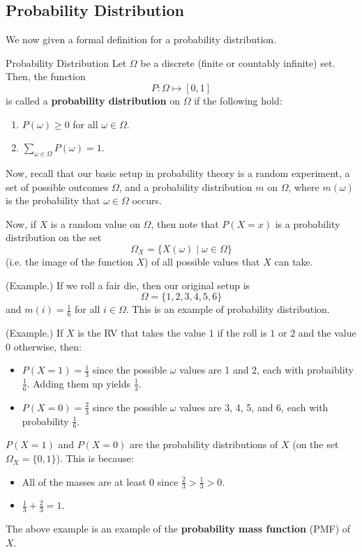 \documentclass[letterpaper]{article}
\begin{document}
\subsection{Probability Distribution}
We now given a formal definition for a probability distribution.
\begin{definition}{Probability Distribution}{}
    Let $\Omega$ be a discrete (finite or countably infinite) set. Then, the function 
    \[P: \Omega \mapsto [0, 1]\]
    is called a \textbf{probability distribution} on $\Omega$ if the following hold: 
    \begin{enumerate}
        \item $P(\omega) \geq 0$ for all $\omega \in \Omega$. 
        \item $\sum_{\omega \in \Omega} P(\omega) = 1$. 
    \end{enumerate}
\end{definition}
Now, recall that our basic setup in probability theory is a random experiment, a set of possible outcomes $\Omega$, and a probability distribution $m$ on $\Omega$, where $m(\omega)$ is the probability that $\omega \in \Omega$ occurs. 

\bigskip 

Now, if $X$ is a random value on $\Omega$, then note that $P(X = x)$ is a probability distribution on the set 
\[\Omega_{X} = \{X(\omega) \mid \omega \in \Omega\}\]
(i.e. the image of the function $X$) of all possible values that $X$ can take. 

\begin{mdframed}[]
    (Example.) If we roll a fair die, then our original setup is 
    \[\Omega = \{1, 2, 3, 4, 5, 6\}\]
    and $m(i) = \frac{1}{6}$ for all $i \in \Omega$. This is an example of probability distribution.
\end{mdframed}

\begin{mdframed}[]
    (Example.) If $X$ is the RV that takes the value $1$ if the roll is $1$ or $2$ and the value $0$ otherwise, then:
    \begin{itemize}
        \item $P(X = 1) = \frac{1}{3}$ since the possible $\omega$ values are 1 and 2, each with probaiblity $\frac{1}{6}$. Adding them up yields $\frac{1}{3}$.
        \item $P(X = 0) = \frac{2}{3}$ since the possible $\omega$ values are 3, 4, 5, and 6, each with probability $\frac{1}{6}$.  
    \end{itemize}
    $P(X = 1)$ and $P(X = 0)$ are the probability distributions of $X$ (on the set $\Omega_{X} = \{0, 1\}$). This is because: 
    \begin{itemize}
        \item All of the masses are at least 0 since $\frac{2}{3} > \frac{1}{3} > 0$.
        \item $\frac{1}{3} + \frac{2}{3} = 1$. 
    \end{itemize}
\end{mdframed}
The above example is an example of the \textbf{probability mass function} (PMF) of $X$. 
\end{document}
